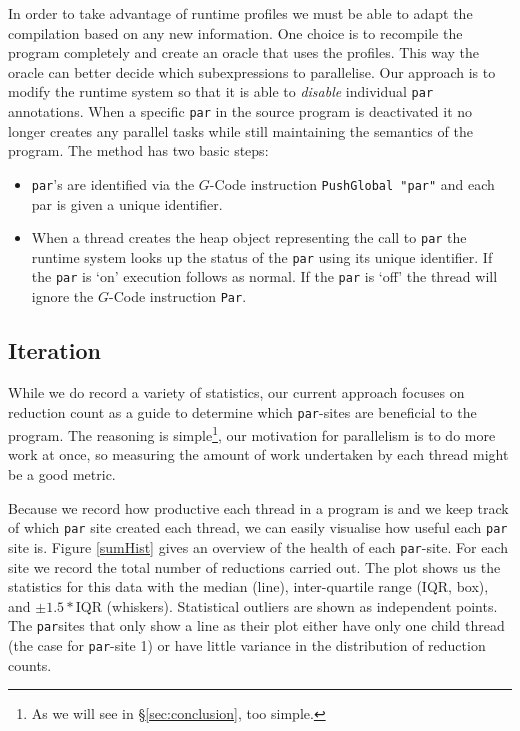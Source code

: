     In order to take advantage of runtime profiles we must be able to adapt the
compilation based on any new information.  One choice is to recompile the
program completely and create an oracle that uses the profiles. This way the
oracle can better decide which subexpressions to parallelise. Our approach is to
modify the runtime system so that it is able to \emph{disable} individual
\verb-par- annotations. When a specific \verb=par= in the source program is
deactivated it no longer creates any parallel tasks while still maintaining the
semantics of the program.  The method has two basic steps:

    \begin{itemize}
        \item \verb=par='s are identified via the $G$-Code instruction
                \verb=PushGlobal "par"= and each par is given a unique identifier.
        \item When a thread creates the heap object representing the call to
                \verb=par= the runtime system looks up the status of the \verb=par= using its
                unique identifier. If the \verb=par= is `on' execution follows as normal. If the
                \verb=par= is `off' the thread will ignore the $G$-Code instruction \verb=Par=.
    \end{itemize}

\subsection*{Iteration}

While we do record a variety of statistics, our current approach focuses on reduction
count as a guide to determine which \verb-par--sites are beneficial to the program.
The reasoning is simple\footnote{As we will see in \S \ref{sec:conclusion}, too simple.},
our motivation for parallelism is to do more work at once, so measuring the amount
of work undertaken by each thread might be a good metric.

Because we record how productive each thread in a program is and we keep track
of which \verb-par- site created each thread, we can easily visualise how useful
each \verb-par- site is. Figure \ref{sumHist} gives an overview of the health
of each \verb-par--site. For each site we record the total number of reductions
carried out. The plot shows us the statistics for this data with the median
(line), inter-quartile range (IQR, box), and $\pm1.5 * $IQR (whiskers).
Statistical outliers are shown as independent points. The \verb-par-sites that
only show a line as their plot either have only one child thread (the case for
\verb-par--site 1) or have little variance in the distribution of reduction
counts.

